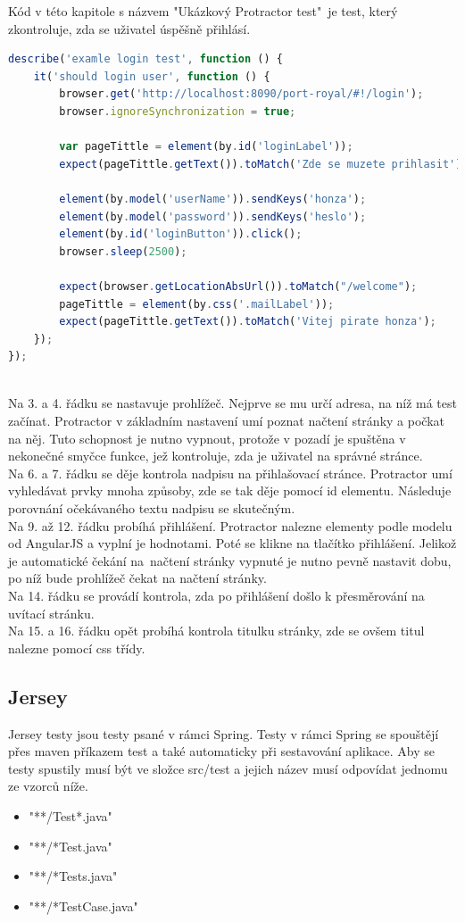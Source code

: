 \documentclass[czech,master,public,dept460,male,cpdeclaration,twoside]{diploma}
\begin{document}
Kód v této kapitole s názvem "Ukázkový Protractor test"~je  test, který zkontroluje, zda se uživatel úspěšně přihlásí.
\\
\begin{lstlisting}[language=JavaScript, caption=Ukázkový Protractor test]
describe('examle login test', function () {
    it('should login user', function () {
        browser.get('http://localhost:8090/port-royal/#!/login');
        browser.ignoreSynchronization = true;

        var pageTittle = element(by.id('loginLabel'));
        expect(pageTittle.getText()).toMatch('Zde se muzete prihlasit');

        element(by.model('userName')).sendKeys('honza');
        element(by.model('password')).sendKeys('heslo');
        element(by.id('loginButton')).click();
        browser.sleep(2500);

        expect(browser.getLocationAbsUrl()).toMatch("/welcome");
        pageTittle = element(by.css('.mailLabel'));
        expect(pageTittle.getText()).toMatch('Vitej pirate honza');
    });
});
\end{lstlisting}
~\\
Na 3. a 4. řádku se nastavuje prohlížeč. Nejprve se mu určí adresa, na níž má test začínat. Protractor v základním nastavení umí poznat načtení stránky a počkat na něj. Tuto schopnost je nutno vypnout, protože v pozadí je spuštěna v nekonečné smyčce funkce, jež kontroluje, zda je uživatel na správné stránce.\\
Na 6. a 7. řádku se děje kontrola nadpisu na přihlašovací stránce. Protractor umí vyhledávat prvky mnoha způsoby, zde se tak děje pomocí id elementu. Následuje porovnání očekávaného textu nadpisu se skutečným.\\
Na 9. až 12. řádku probíhá přihlášení. Protractor nalezne elementy podle modelu od AngularJS a vyplní je hodnotami. Poté se klikne na tlačítko přihlášení. Jelikož je automatické čekání na~načtení stránky vypnuté je nutno pevně nastavit dobu, po níž bude prohlížeč čekat na načtení stránky.\\
Na 14. řádku se provádí kontrola, zda po přihlášení došlo k přesměrování na uvítací stránku.\\
Na 15. a 16. řádku opět probíhá kontrola titulku stránky, zde se ovšem titul nalezne pomocí css třídy.

\subsection{Jersey}
Jersey testy jsou testy psané v rámci Spring. Testy v rámci Spring se spouštějí přes maven příkazem test a také automaticky při sestavování aplikace. Aby se testy spustily musí být ve složce src/test a jejich název musí odpovídat jednomu ze vzorců níže.
\begin{itemize}
	\item "**/Test*.java"
	\item "**/*Test.java"
	\item "**/*Tests.java"
	\item "**/*TestCase.java"
\end{itemize}
\end{document}
